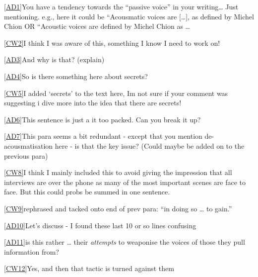 \href{applewebdata://3A1D666A-D52A-46D2-8C90-343A1EE58F85\#_msoanchor_1}{[AD1]}You have a tendency towards the “passive voice” in your writing… Just mentioning. e.g., here it could be “Acousmatic voices are […], as defined by Michel Chion OR “Acoustic voices are defined by Michel Chion as … 

\href{applewebdata://3A1D666A-D52A-46D2-8C90-343A1EE58F85\#_msoanchor_2}{[CW2]}I think I was aware of this, something I know I need to work on!

\href{applewebdata://3A1D666A-D52A-46D2-8C90-343A1EE58F85\#_msoanchor_3}{[AD3]}And why is that? (explain)

\href{applewebdata://3A1D666A-D52A-46D2-8C90-343A1EE58F85\#_msoanchor_4}{[AD4]}So is there something here about secrets?

\href{applewebdata://3A1D666A-D52A-46D2-8C90-343A1EE58F85\#_msoanchor_5}{[CW5]}I added ‘secrets’ to the text here, Im not sure if your comment was suggesting i dive more into the idea that there are secrets!

\href{applewebdata://3A1D666A-D52A-46D2-8C90-343A1EE58F85\#_msoanchor_6}{[AD6]}This sentence is just a it too packed. Can you break it up?

\href{applewebdata://3A1D666A-D52A-46D2-8C90-343A1EE58F85\#_msoanchor_7}{[AD7]}This para seems a bit redundant - except that you mention de-acousmatisation here - is that the key issue? (Could maybe be added on to the previous para) 

\href{applewebdata://3A1D666A-D52A-46D2-8C90-343A1EE58F85\#_msoanchor_8}{[CW8]}I think I mainly included this to avoid giving the impression that all interviews are over the phone as many of the most important scenes are face to face. But this could probs be summed in one sentence.

\href{applewebdata://3A1D666A-D52A-46D2-8C90-343A1EE58F85\#_msoanchor_9}{[CW9]}rephrased and tacked onto end of prev para: “in doing so … to gain.”

\href{applewebdata://3A1D666A-D52A-46D2-8C90-343A1EE58F85\#_msoanchor_10}{[AD10]}Let’s discuss - I found these last 10 or so lines confusing

\href{applewebdata://3A1D666A-D52A-46D2-8C90-343A1EE58F85\#_msoanchor_11}{[AD11]}is this rather … their \textit{attempts }to weaponise the voices of those they pull information from?

\href{applewebdata://3A1D666A-D52A-46D2-8C90-343A1EE58F85\#_msoanchor_12}{[CW12]}Yes, and then that tactic is turned against them

